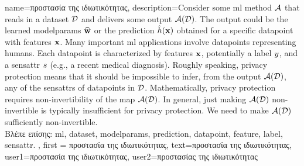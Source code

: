 {name={\foreignlanguage{greek}{προστασία της ιδιωτικότητας}},
     description={Consider some \gls{ml} method $\mathcal{A}$ that reads 
	 in a \gls{dataset} $\mathcal{D}$ and delivers some output $\mathcal{A}(\mathcal{D})$. The output 
	 could be the learned \gls{modelparams} $\widehat{{\bf w}}$ or the \gls{prediction} 
	 $\hat{h}({\bf x})$ obtained for a specific \gls{datapoint} with \gls{feature}s 
	 ${\bf x}$. Many important \gls{ml} applications involve \gls{datapoint}s 
		representing humans. Each \gls{datapoint} is characterized by \gls{feature}s ${\bf x}$, 
		potentially a \gls{label} $y$, and a \gls{sensattr} $s$ (e.g., a recent medical diagnosis). 
		Roughly speaking, privacy protection means that it should be impossible to infer, from the output $\mathcal{A}(\mathcal{D})$, 
		any of the \gls{sensattr}s of \gls{datapoint}s in $\mathcal{D}$. Mathematically, privacy protection requires non-invertibility 
		of the map $\mathcal{A}(\mathcal{D})$. In general, just making $\mathcal{A}(\mathcal{D})$ non-invertible 
		is typically insufficient for privacy protection. We need to make $\mathcal{A}(\mathcal{D})$ sufficiently non-invertible.\\
		\foreignlanguage{greek}{Βλέπε επίσης:} \gls{ml}, \gls{dataset}, \gls{modelparams}, \gls{prediction}, \gls{datapoint}, \gls{feature}, \gls{label}, \gls{sensattr}.
	}, 
	first = {\foreignlanguage{greek}{προστασία της ιδιωτικότητας}}, 
	text={\foreignlanguage{greek}{προστασία της ιδιωτικότητας}},
	user1={\foreignlanguage{greek}{προστασία της ιδιωτικότητας}}, %
   	user2={\foreignlanguage{greek}{προστασίας της ιδιωτικότητας}} %
}


